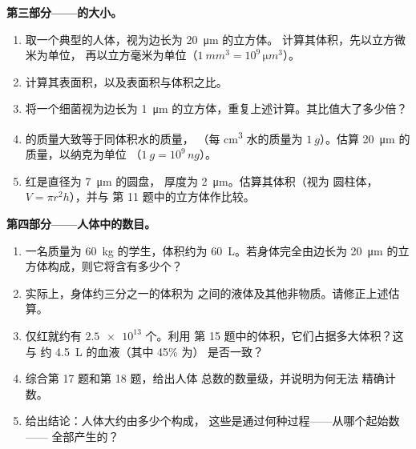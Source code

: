 \begin{problem}
\medskip
\noindent\textbf{第三部分——的大小。}
\begin{enumerate}[resume]
  \item 取一个典型的人体，视为边长为 \qty{20}{\micro m} 的立方体。
        计算其体积，先以立方微米为单位，
        再以立方毫米为单位（$\qty{1}{mm^3} = 10^9\,\unit{\micro m^3}$）。
  \item 计算其表面积，以及表面积与体积之比。
  \item 将一个细菌视为边长为
        \qty{1}{\micro m} 的立方体，重复上述计算。其比值大了多少倍？
  \item {}的质量大致等于同体积水的质量，
        （每 \unit{cm^3} 水的质量为 $\qty{1}{g}$）。估算
        \qty{20}{\micro m} 的质量，以纳克为单位
        （$\qty{1}{g} = 10^9\,\unit{ng}$）。
  \item 红是直径为 \qty{7}{\micro m} 的圆盘，
        厚度为 \qty{2}{\micro m}。估算其体积（视为
        圆柱体，$V = \pi r^2 h$），并与
        第 11 题中的立方体作比较。
\end{enumerate}

\medskip
\noindent\textbf{第四部分——人体中的数目。}
\begin{enumerate}[resume]
  \item 一名质量为 \qty{60}{kg} 的学生，体积约为
        \qty{60}{L}。若身体完全由边长为 \qty{20}{\micro m}
        的立方体构成，则它将含有多少个？
  \item 实际上，身体约三分之一的体积为
        之间的液体及其他非物质。请修正上述估算。
  \item 仅红就约有 $\num{2.5e13}$ 个。利用
        第 15 题中的体积，它们占据多大体积？这与
        约 \qty{4.5}{L} 的血液（其中 45\% 为）
        是否一致？
  \item 综合第 17 题和第 18 题，给出人体
        总数的数量级，并说明为何无法
        精确计数。
  \item 给出结论：人体大约由多少个构成，
        这些是通过何种过程——从哪个起始数——
        全部产生的？
\end{enumerate}
\end{problem}
